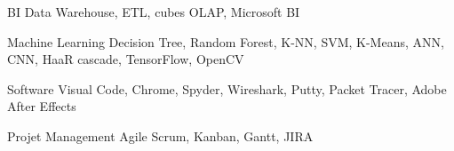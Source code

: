 \begin{cvskills}
\cvskill
    {BI} %
    {Data Warehouse, ETL, cubes OLAP, Microsoft BI } %


\cvskill
    {Machine Learning} %
    {Decision Tree, Random Forest, K-NN, SVM, K-Means, ANN, CNN, HaaR cascade, TensorFlow, OpenCV } %


\cvskill
    {Software} %
    {Visual Code, Chrome, Spyder, Wireshark, Putty, Packet Tracer, Adobe After Effects  } %


\cvskill
    {Projet Management} %
    {Agile Scrum, Kanban, Gantt, JIRA } %

\end{cvskills}
